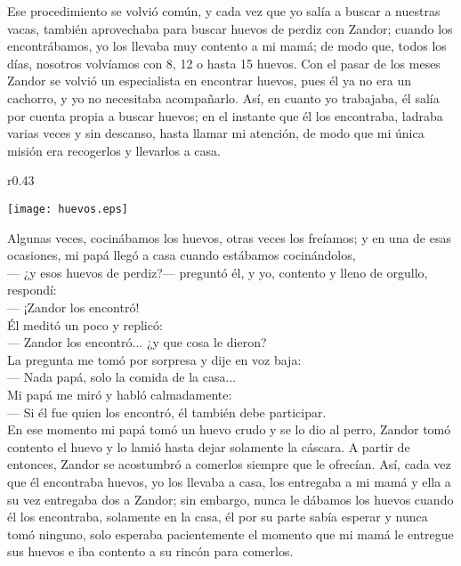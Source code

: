 Ese procedimiento se volvió común, y cada vez que yo salía a buscar a nuestras vacas, también aprovechaba para buscar huevos de perdiz con Zandor; cuando los encontrábamos, yo los llevaba muy contento a mi mamá; de modo que, todos los días, nosotros volvíamos con 8, 12 o hasta 15 huevos.
Con el pasar de los meses Zandor se volvió un especialista en encontrar huevos, pues él ya no era un cachorro, y yo no necesitaba acompañarlo. Así, en cuanto yo trabajaba, él salía por cuenta propia a buscar huevos; en el instante que él los encontraba, ladraba varias veces y sin descanso, hasta llamar mi atención, de modo que mi única misión era recogerlos y llevarlos a casa.
\ifdefined\EnableIncludeImages
\begin{wrapfigure}{r}{0.43\textwidth}
  \begin{center}
  \vspace{-20pt}
    \texttt{[image: huevos.eps]}
  \end{center}
  \vspace{-20pt}
\end{wrapfigure}
\fi
Algunas veces, cocinábamos los huevos, otras veces los freíamos; y en una de esas ocasiones, mi papá llegó a casa cuando estábamos cocinándolos,\\\indent
--- ¿y esos huevos de perdiz?--- preguntó él, 
y yo, contento y lleno de orgullo, respondí:\\\indent
--- ¡Zandor los encontró!\\\indent
Él meditó un poco y replicó:\\\indent 
--- Zandor los encontró... ¿y que cosa le dieron?\\\indent 
La pregunta me tomó por sorpresa y dije en voz baja:\\\indent 
--- Nada papá, solo la comida de la casa...\\\indent
Mi papá me miró y habló calmadamente:\\\indent 
--- Si él fue quien los encontró, él también debe participar.\\\indent
En ese momento mi papá tomó un huevo crudo y se lo dio al perro, Zandor tomó contento el huevo y lo lamió hasta dejar solamente la cáscara. A partir de entonces, Zandor se acostumbró a comerlos siempre que le ofrecían. 
Así, cada vez que él encontraba huevos, yo los llevaba a casa, los entregaba a mi mamá y ella a su vez entregaba dos a Zandor; sin embargo, nunca le dábamos los huevos cuando él los encontraba, solamente en la casa, él por su parte sabía esperar y nunca tomó ninguno, solo esperaba pacientemente el momento que mi mamá le entregue sus huevos e iba contento a su rincón para comerlos.


